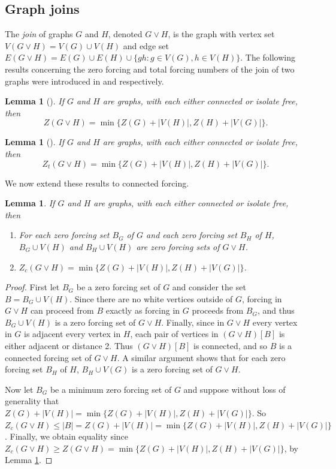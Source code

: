 \documentclass[11pt]{article}
\newtheorem{lem}[thm]{Lemma}
\theoremstyle{definition}
\newcommand{\1}{\vspace{0.1cm}}
\newcommand{\2}{\vspace{0.2cm}}
\newcommand{\3}{\vspace{0.3cm}}
\begin{document}
\subsection{Graph joins}

The \emph{join} of graphs $G$ and $H$, denoted $G \vee H$, is the graph with vertex set $V(G \vee H)=V(G) \cup V(H)$ and edge set $E(G \vee H)=E(G) \cup E(H) \cup \{gh: g \in V(G), h \in V(H)\}$.  The following results concerning the zero forcing and total forcing numbers of the join of two graphs were introduced in \cite{join} and \cite{DaHePe2023a} respectively. 

\begin{lem}[\cite{join}]\label{l:join:z}
If $G$ and $H$ are graphs, with each either connected or isolate free, then
\[
Z(G \vee H)=\min\{Z(G)+|V(H)|,Z(H)+|V(G)|\}.
\]
\end{lem}

\begin{lem}[\cite{DaHePe2023a}]\label{l:join:t}
If $G$ and $H$ are graphs, with each either connected or isolate free, then
\[
Z_t(G \vee H)=\min\{Z(G)+|V(H)|,Z(H)+|V(G)|\}.
\]
\end{lem}

We now extend these results to connected forcing. 
\begin{lem}\label{l:join:c}
If $G$ and $H$ are graphs, with each either connected or isolate free, then 
\begin{enumerate}
\item For each zero forcing set $B_G$ of $G$ and each zero forcing set $B_H$ of $H$, $B_G \cup V(H)$ and $B_H \cup V(H)$ are zero forcing sets of $G \vee H$.
\item $Z_c(G \vee H)=\min\{Z(G)+|V(H)|,Z(H)+|V(G)|\}$.
\end{enumerate}
\end{lem}

\begin{proof}
First let $B_G$ be a zero forcing set of $G$ and consider the set $B=B_G \cup V(H)$.  Since there are no white vertices outside of $G$, forcing in $G \vee H$ can proceed from $B$ exactly as forcing in $G$ proceeds from $B_G$, and thus $B_G \cup V(H)$ is a zero forcing set of $G \vee H$.  Finally, since in $G \vee H$ every vertex in $G$ is adjacent every vertex in $H$, each pair of vertices in $(G \vee H)[B]$ is either adjacent or distance 2.  Thus $(G \vee H)[B]$ is connected, and so $B$ is a connected forcing set of $G \vee H$.  A similar argument shows that for each zero forcing set $B_H$ of $H$, $B_H \cup V(G)$ is a zero forcing set of $G \vee H$.

Now let $B_G$ be a minimum zero forcing set of $G$ and suppose without loss of generality that $Z(G)+|V(H)|=\min\{Z(G)+|V(H)|,Z(H)+|V(G)|\}$.    So $Z_c(G \vee H) \leq |B|=Z(G)+|V(H)|=\min\{Z(G)+|V(H)|,Z(H)+|V(G)|\}$.  Finally, we obtain equality since $Z_c(G \vee H) \geq Z(G \vee H)=\min\{Z(G)+|V(H)|,Z(H)+|V(G)|\}$, by Lemma \ref{l:join:z}.
\end{proof}
\end{document}
